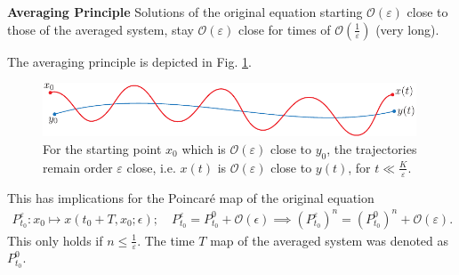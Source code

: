 \begin{framed}
	\noindent
	\textbf{Averaging Principle} Solutions of the original equation starting $\mathcal{O}(\varepsilon)$ close to those of the averaged system, stay $\mathcal{O}(\varepsilon)$ close for times of $\mathcal{O}\left(\frac{1}{\varepsilon}\right)$ (very long).
\end{framed}

The averaging principle is depicted in Fig. \ref{fig:avg_principle}.
\begin{figure}[h!]
	\centering
	\includegraphics[width=0.99\textwidth]{figures/ch5/3avg_principle.pdf}
	\caption{For the starting point $x_0$ which is $\mathcal{O}(\varepsilon)$ close to $y_0$, the trajectories remain order $\varepsilon$ close, i.e. $x(t)$ is $\mathcal{O}(\varepsilon)$ close to $y(t)$, for $t \ll \frac{K}{\varepsilon}$.}
	\label{fig:avg_principle}
\end{figure}

This has implications for the Poincaré map of the original equation
\begin{align}
	P_{t_0}^{\varepsilon}:x_0 \mapsto x(t_0+T, x_0; \epsilon);\quad P_{t_0}^{\varepsilon} = P_{t_0}^{0} + \mathcal{O}(\epsilon) \implies \left( P_{t_0}^{\varepsilon}\right)^{n} = \left( P_{t_0}^{0}\right)^{n} + \mathcal{O}(\varepsilon).
\end{align}
This only holds if $n \leq \frac{1}{\varepsilon}$. The time $T$ map of the averaged system was denoted as $P_{t_0}^{0}$.

